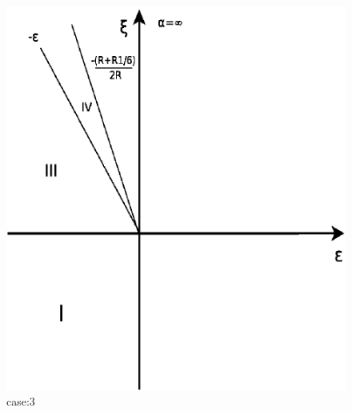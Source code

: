 \documentclass[12pt]{article}
\begin{document}
\begin{figure}
 \includegraphics{./Diagram8.pdf}
 \caption{case:3}
 \label{fig:7}
\end{figure}
\end{document}

